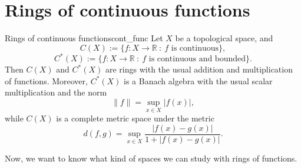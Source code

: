 \documentclass[a4paper]{book}
\theoremstyle{definition}
\theoremstyle{ejemplo}
\theoremstyle{demostracion}
\newcommand{\reales}{\mathbb{R}}
\begin{document}
\section{Rings of continuous functions}\label{sect_ringscont}
\begin{define}{Rings of continuous functions}{cont_func}
	Let $X$ be a topological space, and 
	\begin{equation*}
		C(X) := \{ f: X \rightarrow \reales\ :\ f \text{ is continuous} \},
	\end{equation*}
	\begin{equation*}
		C^*(X) := \{ f: X \rightarrow \reales\ :\ f \text{ is continuous and bounded} \}.
	\end{equation*}
	Then $C(X)$ and $C^*(X)$ are rings with the usual addition and multiplication of functions. Moreover, $C^*(X)$ is a Banach algebra with the usual scalar multiplication and the norm
	\begin{equation*}
		\| f \| = \sup_{x \in X} | f(x) |,
	\end{equation*}
	while $C(X)$ is a complete metric space under the metric
	\begin{equation*}
		d(f, g) = \sup_{x \in X} \frac{| f(x) - g(x) |}{1 + |f(x) - g(x)|}.
	\end{equation*}
\end{define}

Now, we want to know what kind of spaces we can study with rings of functions.
\end{document}
